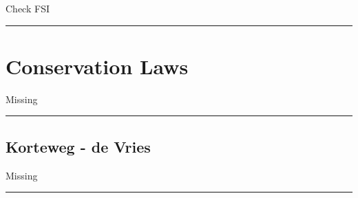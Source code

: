 
Check FSI

\rule{0.31\textwidth}{1pt}


\vspace{-1em}

\section{\texorpdfstring{\color{forestgreen(web)}Conservation Laws}{}}


Missing

\rule{0.31\textwidth}{0.2pt}


\subsection{\texorpdfstring{\color{red}Korteweg - de Vries}{}}


Missing

\rule{0.31\textwidth}{1pt}